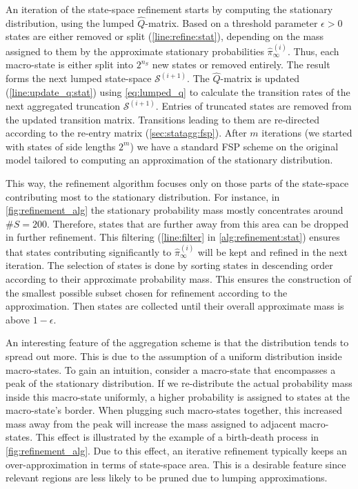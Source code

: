 An iteration of the state-space refinement starts by computing the
stationary distribution, using the lumped $\hat Q$-matrix.
Based on a threshold parameter $\epsilon>0$
states are either removed or split (\autoref{line:refine:stat}), depending on
the mass assigned to them by the approximate stationary
probabilities $\hat\pi^{(i)}_{\infty}$.
Thus, each macro-state is either split into $2^{n_S}$ new states or removed
entirely.
The result forms the next lumped state-space $\mathcal{S}^{(i+1)}$.
The $\hat{Q}$-matrix is updated (\autoref{line:update_q:stat}) using
\eqref{eq:lumped_q} to calculate the transition rates of the next
aggregated truncation $\mathcal{S}^{(i+1)}$.
Entries of truncated states are removed from the updated transition matrix.
Transitions leading to them are
re-directed according to the re-entry matrix (\autoref{sec:statagg:fsp}).
After $m$ iterations (we started with states of side lengths $2^m$)
we have a standard \ac{FSP} scheme
on the original model tailored to
computing an approximation of the stationary distribution.

This way, the refinement algorithm focuses only on those parts of the
state-space contributing most to the stationary distribution.
For instance, in \autoref{fig:refinement_alg} the stationary
probability mass mostly concentrates around $\#S=200$.
Therefore, states that are further away from this area can be dropped
in further refinement.
This filtering (\autoref{line:filter} in
\autoref{alg:refinement:stat}) ensures that
states contributing significantly to $\hat\pi_{\infty}^{(i)}$ will be
kept and refined in the next iteration.
The selection of states is done by sorting states in descending order
according to their approximate probability mass.
This ensures the construction of the smallest possible subset chosen
for refinement according to the approximation.
Then states are collected until their overall approximate mass is
above $1-\epsilon$.

An interesting feature of   the aggregation scheme is that the distribution
tends to spread out more.
This is due to the assumption of a uniform distribution inside macro-states.
To gain an intuition, consider a macro-state that encompasses a peak
of the stationary distribution.
If we re-distribute the actual probability mass inside this
macro-state uniformly,
a higher probability is assigned to states at the macro-state's border.
When plugging such macro-states together, this increased mass away
from the peak will
increase the mass assigned to adjacent macro-states.
This effect is illustrated by the example of a birth-death process in
\autoref{fig:refinement_alg}.
Due to this effect, an iterative refinement typically keeps an
over-approximation in terms of state-space area.
This is a desirable feature since relevant regions are less likely to
be pruned due to lumping approximations.

